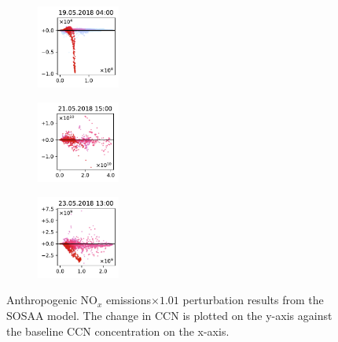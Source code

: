 \begin{figure}[H]
    \begin{subfigure}
        \centering
        \includegraphics[width=0.30\textwidth,valign=t]{evaluation/figures/perturbations/perturbation-19.05.2018:04.00-nox-mul-1.01.pdf}
    \end{subfigure}
    \begin{subfigure}
        \centering
        \includegraphics[width=0.30\textwidth,valign=t]{evaluation/figures/perturbations/perturbation-21.05.2018:15.00-nox-mul-1.01.pdf}
    \end{subfigure}
    \begin{subfigure}
        \centering
        \includegraphics[width=0.30\textwidth,valign=t]{evaluation/figures/perturbations/perturbation-23.05.2018:13.00-nox-mul-1.01.pdf}
    \end{subfigure}

    \caption[$\text{NO}_x$ emissions$\times 1.01$ perturbation SOSAA results]{Anthropogenic $\text{NO}_x$ emissions$\times 1.01$ perturbation results from the SOSAA model. The change in CCN is plotted on the y-axis against the baseline CCN concentration on the x-axis.}
    \label{fig:sosaa-perturbation-nox-mul-1.01}
\end{figure}

